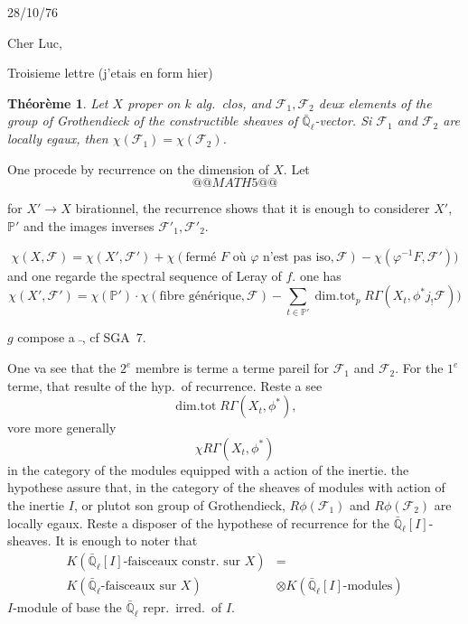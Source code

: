 \documentclass[11pt,a4paper]{article}
\theoremstyle{plain}
\newtheorem{theorem}{Th\'eor\`eme}
\theoremstyle{definition}
\DeclareMathOperator{\dimtot}{dim.tot}
\begin{document}
\newpage

\begin{flushright}
28/10/76
\end{flushright}

\noindent Cher Luc,

\begin{flushright}
Troisieme lettre (j'etais en form hier)
\end{flushright}

\begin{theorem}
Let $X$ proper on $k$ alg.\ clos, and $\mathcal{F}_1, \mathcal{F}_2$ deux elements of the group of Grothendieck of the constructible sheaves of $\bar{\mathbb{Q}}_\ell$-vector. Si $\mathcal{F}_1$ and $\mathcal{F}_2$ are locally egaux, then $\chi(\mathcal{F}_1) = \chi(\mathcal{F}_2)$.
\end{theorem}

One procede by recurrence on the dimension of $X$. Let
\[
@@MATH5@@
\]

for $X' \to X$ birationnel, the recurrence shows that it is enough to considerer $X'$, $\mathbb{P}'$ and the images inverses $\mathcal{F}'_1, \mathcal{F}'_2$.

\[
\chi(X, \mathcal{F}) = \chi(X', \mathcal{F}') + \chi(\text{ferm\'e } F \text{ o\`u } \varphi \text{ n'est pas iso}, \mathcal{F}) - \chi(\varphi^{-1}F, \mathcal{F}'))
\]
and one regarde the spectral sequence of Leray of $f$. one has
\[
\chi(X', \mathcal{F}') = \chi(\mathbb{P}') \cdot \chi(\text{fibre g\'en\'erique}, \mathcal{F}) - \sum_{t \in \mathbb{P}'} \dimtot_p R\Gamma(X_t, \phi^* j_! \mathcal{F}))
\]

$g$ compose a $\bar{}$, cf SGA~7.

One va see that the $2^e$ membre is terme a terme pareil for $\mathcal{F}_1$ and $\mathcal{F}_2$. For the $1^e$ terme, that resulte of the hyp.\ of recurrence. Reste a see
\[
\dimtot R\Gamma(X_t, \phi^*),
\]
vore more generally
\[
\chi R\Gamma(X_t, \phi^*)
\]
in the category of the modules equipped with a action of the inertie. the hypothese assure that, in the category of the sheaves of modules with action of the inertie $I$, or plutot son group of Grothendieck, $R\phi(\mathcal{F}_1)$ and $R\phi(\mathcal{F}_2)$ are locally egaux. Reste a disposer of the hypothese of recurrence for the $\bar{\mathbb{Q}}_\ell[I]$-sheaves. It is enough to noter that
\begin{align*}
K(\bar{\mathbb{Q}}_\ell[I]\text{-faisceaux constr.\ sur } X) &= \\
K(\bar{\mathbb{Q}}_\ell\text{-faisceaux sur } X) &\otimes K(\bar{\mathbb{Q}}_\ell[I]\text{-modules})
\end{align*}
$I$-module of base the $\bar{\mathbb{Q}}_\ell$ repr.\ irred.\ of $I$.
\end{document}
